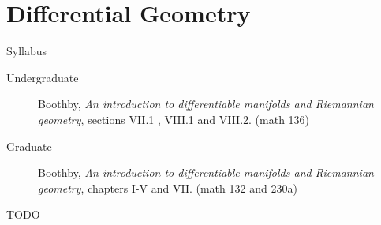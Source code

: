\section{Differential Geometry}
\label{S:differential-geometry}

Syllabus
\begin{description}
\item[Undergraduate] Boothby, \emph{An introduction to differentiable manifolds and Riemannian geometry}, sections VII.1 , VIII.1 and VIII.2. (math 136)
\item[Graduate] Boothby, \emph{An introduction to differentiable manifolds and Riemannian geometry}, chapters I-V and VII. (math 132 and 230a)
\end{description}

TODO

